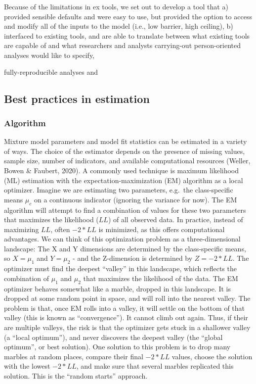 \documentclass[
  ,man]{apa6}
\begin{document}
Because of the limitations in ex tools, we set out to develop a tool that a)
provided sensible defaults and were easy to use, but provided the option to
access and modify all of the inputs to the model (i.e., low barrier, high
ceiling), b) interfaced to existing tools, and are able to translate between
what existing tools are capable of and what researchers and analysts
carrying-out person-oriented analyses would like to specify,

fully-reproducible analyses and

\hypertarget{best-practices-in-estimation}{%
\subsection{Best practices in estimation}\label{best-practices-in-estimation}}

\hypertarget{algorithm}{%
\subsubsection{Algorithm}\label{algorithm}}

Mixture model parameters and model fit statistics can be estimated in a variety of ways.
The choice of the estimator depends on the presence of missing values,
sample size, number of indicators, and available computational resources (Weller, Bowen \& Faubert, 2020).
A commonly used technique is maximum likelihood (ML) estimation
with the expectation-maximization (EM) algorithm as a local optimizer.
Imagine we are estimating two parameters, e.g.~the class-specific means \(\mu_c\) on a continuous indicator
(ignoring the variance for now). The EM algorithm will attempt to find a combination of values
for these two parameters that maximizes the likelihood (\(LL\)) of all observed data.
In practice, instead of maximizing \(LL\), often \(-2*LL\) is minimized, as this offers computational advantages.
We can think of this optimization problem as a three-dimensional landscape:
The X and Y dimensions are determined by the class-specific means,
so \(X = \mu_1\) and \(Y = \mu_2\) - and the Z-dimension is determined by \(Z = -2*LL\).
The optimizer must find the deepest ``valley'' in this landscape,
which reflects the combination of \(\mu_1\) and \(\mu_2\) that maximizes the likelihood of the data.
The EM optimizer behaves somewhat like a marble, dropped in this landscape.
It is dropped at some random point in space, and will roll into the nearest valley.
The problem is that, once EM rolls into a valley, it will settle on the bottom of that valley
(this is known as ``convergence'').
It cannot climb out again.
Thus, if their are multiple valleys, the risk is that the optimizer gets stuck in a shallower valley
(a ``local optimum''), and never discovers the deepest valley (the ``global optimum'', or best solution).
One solution to this problem is to drop many marbles at random places, compare their final \(-2*LL\) values,
choose the solution with the lowest \(-2*LL\), and make sure that several marbles replicated this solution.
This is the ``random starts'' approach.
\end{document}
